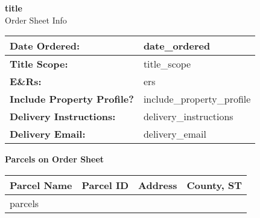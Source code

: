 \documentclass[a4paper,12pt]{article}
\begin{document}
\begin{center}
    {\LARGE \textbf{{{title}}}} \\
    \vspace{0.5em}
    {\Large Order Sheet Info}
\end{center}

\vspace{1.5em}

\begin{tabularx}{\textwidth}{@{} l X @{}}
    \toprule
    \textbf{Date Ordered:} & {{date_ordered}} \\
    \midrule
    \textbf{Title Scope:} & {{title_scope}} \\
    \midrule
    \textbf{E\&Rs:} & {{ers}} \\
    \midrule
    \textbf{Include Property Profile?} & {{include_property_profile}} \\
    \midrule
    \textbf{Delivery Instructions:} & {{delivery_instructions}} \\
    \midrule
    \textbf{Delivery Email:} & {{delivery_email}} \\
    \bottomrule
\end{tabularx}

\vspace{2em}

\begin{center}
    {\Large \textbf{Parcels on Order Sheet}}
\end{center}

\vspace{1em}

\begin{tabularx}{\textwidth}{@{} l l X l @{}}
    \toprule
    \textbf{Parcel Name} & \textbf{Parcel ID} & \textbf{Address} & \textbf{County, ST} \\
    \midrule
    {{parcels}}
    \bottomrule
\end{tabularx}
\end{document}
